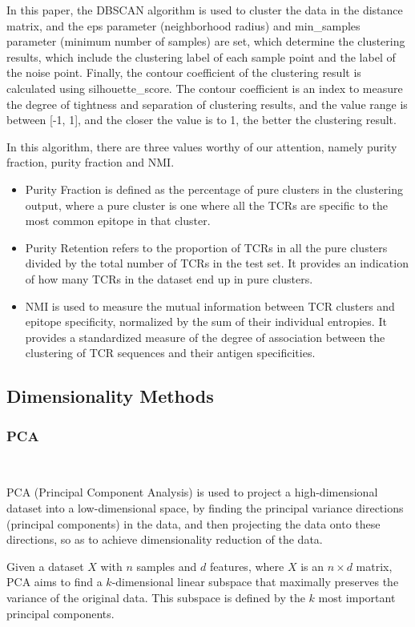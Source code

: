 \documentclass[conference]{IEEEtran}
\begin{document}
	In this paper, the DBSCAN algorithm is used to cluster the data in the distance matrix, and the eps parameter (neighborhood radius) and min\_samples parameter (minimum number of samples) are set, which determine the clustering results, which include the clustering label of each sample point and the label of the noise point. Finally, the contour coefficient of the clustering result is calculated using silhouette\_score. The contour coefficient is an index to measure the degree of tightness and separation of clustering results, and the value range is between [-1, 1], and the closer the value is to 1, the better the clustering result.
	
	In this algorithm, there are three values worthy of our attention, namely purity fraction, purity fraction and NMI\cite{b1}.
	\begin{itemize}
		\item Purity Fraction is defined as the percentage of pure clusters in the clustering output, where a pure cluster is one where all the TCRs are specific to the most common epitope in that cluster. 
		\item Purity Retention refers to the proportion of TCRs in all the pure clusters divided by the total number of TCRs in the test set. It provides an indication of how many TCRs in the dataset end up in pure clusters. 
		\item NMI is used to measure the mutual information between TCR clusters and epitope specificity, normalized by the sum of their individual entropies. It provides a standardized measure of the degree of association between the clustering of TCR sequences and their antigen specificities.
	\end{itemize}
	
	\subsection{Dimensionality Methods}
	\subsubsection{PCA} \
	
	PCA (Principal Component Analysis)\cite{b2}\cite{b3} is used to project a high-dimensional dataset into a low-dimensional space, by finding the principal variance directions (principal components) in the data, and then projecting the data onto these directions, so as to achieve dimensionality reduction of the data.
	
	Given a dataset \( X \) with \( n \) samples and \( d \) features, where \( X \) is an \( n \times d \) matrix, PCA aims to find a \( k \)-dimensional linear subspace that maximally preserves the variance of the original data. This subspace is defined by the \( k \) most important principal components.
	
\end{document}
